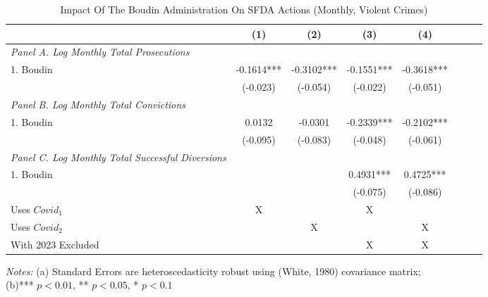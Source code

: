 \begin{table}[htbp]
  \centering
  \caption{Impact Of The Boudin Administration On SFDA Actions (Monthly, Violent Crimes)}
  \label{tab:regression_ca_vc}
  \begin{tabular}{lccccccc}
    \toprule
    & \multirow{1}{*}{(1)} & \multirow{1}{*}{(2)} & \multirow{1}{*}{(3)} & \multirow{1}{*}{(4)} \\
    \midrule
    \textit{Panel A. Log Monthly Total Prosecutions}  &   &   &  &  \\
    1. Boudin  & -0.1614*** & -0.3102*** & -0.1551*** & -0.3618*** \\
     & (-0.023) & (-0.054) & (-0.022) & (-0.051) \\ \addlinespace

    \textit{Panel B. Log Monthly Total Convictions}  &   &   &  &  \\
    1. Boudin  & 0.0132 & -0.0301 & -0.2339*** & -0.2102*** \\
     & (-0.095) & (-0.083) & (-0.048) & (-0.061) \\ \addlinespace

    \textit{Panel C. Log Monthly Total Successful Diversions}  &   &   &  &  \\
    1. Boudin  &  &  & 0.4931*** & 0.4725*** \\
     & & & (-0.075) & (-0.086) \\ \addlinespace
     Uses $Covid_1$ & X & & X & \\
     Uses $Covid_2$ & & X & & X \\
     With 2023 Excluded & & & X & X \\
    \bottomrule
  \end{tabular}
  
  \begin{flushleft}
    \textit{Notes:} (a) Standard Errors are heteroscedasticity robust using (White, 1980) covariance matrix; \\
    (b)*** $p<0.01$, ** $p<0.05$, * $p<0.1$
  \end{flushleft}
\end{table}